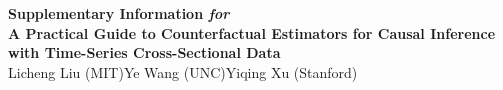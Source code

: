\documentclass[12pt]{article}
\let\oldcenter\center
\let\oldendcenter\endcenter
\renewenvironment{center}{\setlength\topsep{0pt}\oldcenter}{\oldendcenter}
\begin{document}
\onehalfspacing
\date{
  \vspace{-0.5em}\hspace{1.2em}(MIT)\hspace{4.8em}(UNC)\hspace{3.5em}{(Stanford)} \\\vspace{1em}
  First version: 11th July 2019\\
  This version: \today\vspace{2em} 
}


\onehalfspacing
\renewcommand\thesection{\Alph{section}}
\setcounter{page}{1}
\setcounter{table}{0}
\setcounter{figure}{0}
\setcounter{equation}{0}
\setcounter{footnote}{0}
\renewcommand\thetable{A\arabic{table}}
\renewcommand\thefigure{A\arabic{figure}}
\renewcommand{\theequation}{A\arabic{equation}}
\renewcommand{\thefootnote}{A\arabic{footnote}}


\setcounter{proposition}{0}

\begin{center}
{\Large\bf Supplementary Information \emph{for}}\\\bigskip
{\large\bf A Practical Guide to Counterfactual Estimators for Causal Inference with Time-Series Cross-Sectional Data}\\\bigskip
{\normalsize Licheng Liu (MIT)\hspace{2em}Ye Wang (UNC)\hspace{2em}Yiqing Xu (Stanford)}
\end{center}
\bigskip

\vspace{2em}

\noindent{}
\end{document}
